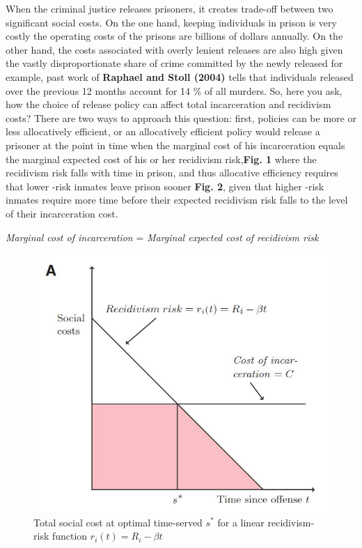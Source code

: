 \documentclass[a4paper,12pt]{article}
\begin{document}
When the criminal justice releases prisoners, it creates trade-off between two significant social costs. On the one hand, keeping individuals in prison is very costly the operating costs of the prisons are billions of dollars annually. On the other hand, the costs associated with overly lenient releases are also high given the vastly disproportionate share of crime committed by the newly released for example, past work of \textbf{Raphael and Stoll (2004)} \cite{Rafael2004} tells that individuals released over the previous 12 months account for 14 \% of all murders. So, here you ask, how the choice of release policy can affect total incarceration and recidivism costs? There are two ways to approach this question: first, policies can be more or less allocatively efficient, or an allocatively efficient policy would release a prisoner at the point in time when the marginal cost of his incarceration equals the marginal expected cost of his or her recidivism risk,\textbf{Fig. 1} where the recidivism risk falls with time in prison, and thus allocative efficiency requires that lower -risk inmates leave prison sooner \textbf{Fig. 2}, given that higher -risk inmates require more time before their expected recidivism risk falls to the level of their incarceration cost. 

    \textit{Marginal cost of incarceration} = \textit{Marginal expected cost of recidivism risk}
    
\begin{figure}[h]
\centering
\includegraphics[scale=0.60]{fig1.JPG}
\caption{Total social cost at optimal time-served $s^*$ for a linear recidivism-risk function $r_i(t) = R_i - \beta t$}
\label{fig:Figure 1}
\end{figure}
\end{document}
